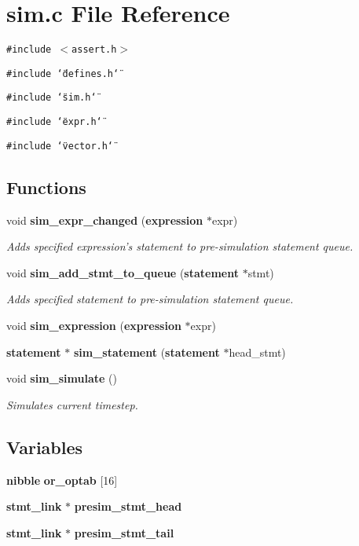 \section{sim.c File Reference}
\label{sim_8c}
{\tt \#include $<$assert.h$>$}\par
{\tt \#include \char`\"{}defines.h\char`\"{}}\par
{\tt \#include \char`\"{}sim.h\char`\"{}}\par
{\tt \#include \char`\"{}expr.h\char`\"{}}\par
{\tt \#include \char`\"{}vector.h\char`\"{}}\par
\subsection*{Functions}
\begin{CompactItemize}
\item 
void {\bf sim\_\-expr\_\-changed} ({\bf expression} $\ast$expr)
\begin{CompactList}\small\item\em Adds specified expression's statement to pre-simulation statement queue.\item\end{CompactList}\item 
void {\bf sim\_\-add\_\-stmt\_\-to\_\-queue} ({\bf statement} $\ast$stmt)
\begin{CompactList}\small\item\em Adds specified statement to pre-simulation statement queue.\item\end{CompactList}\item 
void {\bf sim\_\-expression} ({\bf expression} $\ast$expr)
\item 
{\bf statement} $\ast$ {\bf sim\_\-statement} ({\bf statement} $\ast$head\_\-stmt)
\item 
void {\bf sim\_\-simulate} ()
\begin{CompactList}\small\item\em Simulates current timestep.\item\end{CompactList}\end{CompactItemize}
\subsection*{Variables}
\begin{CompactItemize}
\item 
{\bf nibble} {\bf or\_\-optab} [16]
\item 
{\bf stmt\_\-link} $\ast$ {\bf presim\_\-stmt\_\-head}
\item 
{\bf stmt\_\-link} $\ast$ {\bf presim\_\-stmt\_\-tail}
\end{CompactItemize}


